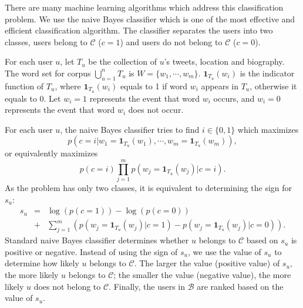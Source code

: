 \documentclass{article}
\begin{document}

There are many machine learning algorithms which address this classification problem. We use the naive Bayes classifier \cite{maron1961automatic} which is one of the most effective and efficient classification algorithm. The classifier separates the users into two classes, users belong to $\mathcal{C}$ ($c = 1$) and users do not belong to $\mathcal{C}$ ($c = 0$).

For each user $u$, let $T_u$ be the collection of $u$'s tweets, location and biography. The word set for corpus $\bigcup_{u = 1}^n T_u$ is $W = \{w_1, \cdots, w_m\}$.
$\mathbf{1}_{T_u}(w_i)$ is the indicator function of $T_u$, where $\mathbf{1}_{T_u}(w_i)$ equals to 1 if word $w_i$ appears in $T_u$, otherwise it equals to 0. Let $w_i = 1$ represents the event that word $w_i$ occurs, and $w_i = 0$ represents the event that word $w_i$ does not occur.

For each user $u$, the naive Bayes classifier tries to find $i \in \{0, 1\}$ which maximizes
$$p(c = i | w_1 = \mathbf{1}_{T_u}(w_1), \cdots, w_m = \mathbf{1}_{T_u}(w_m)),$$
or equivalently maximizes
$$p(c = i) \prod_{j=1}^m p(w_j = \mathbf{1}_{T_u}(w_j) | c = i).$$
As the problem has only two classes, it is equivalent to determining the sign for $s_u$:
\begin{eqnarray}
s_u & = & \log(p(c = 1)) - \log(p(c = 0)) \nonumber \\
    & + & \sum_{j=1}^m (p(w_j = \mathbf{1}_{T_u}(w_j)|c = 1) - p(w_j = \mathbf{1}_{T_u}(w_j)|c = 0)). \nonumber
\end{eqnarray}
Standard naive Bayes classifier determines whether $u$ belongs to $\mathcal{C}$ based on $s_u$ is positive or negative. Instead of using the sign of $s_u$, we use the value of $s_u$ to determine how likely $u$ belongs to $\mathcal{C}$. The larger the value (positive value) of $s_u$, the more likely $u$ belongs to $\mathcal{C}$; the smaller the value (negative value), the more likely $u$ does not belong to $\mathcal{C}$. Finally, the users in $\mathcal{B}$ are ranked based on the value of $s_u$.
\end{document}
